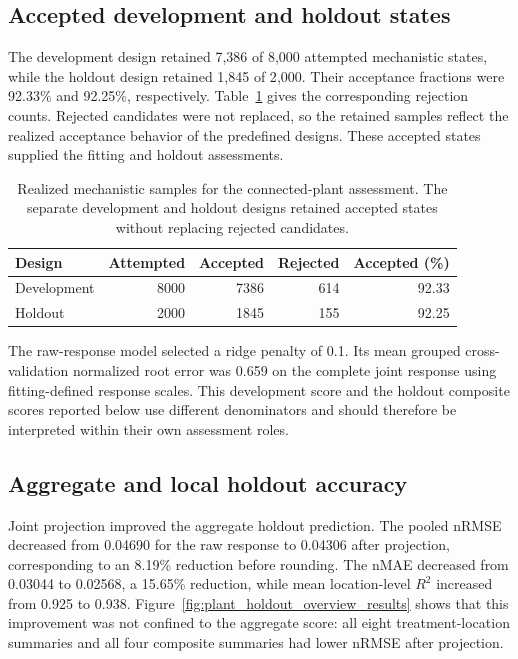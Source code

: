 \subsection{Accepted development and holdout states}

The development design retained 7{,}386 of 8{,}000 attempted mechanistic states, while the holdout design retained 1{,}845 of 2{,}000. Their acceptance fractions were 92.33\% and 92.25\%, respectively. Table~\ref{tab:plant_sample_results} gives the corresponding rejection counts. Rejected candidates were not replaced, so the retained samples reflect the realized acceptance behavior of the predefined designs. These accepted states supplied the fitting and holdout assessments.

\begin{table}[htbp]
\centering\small
\caption{Realized mechanistic samples for the connected-plant assessment. The separate development and holdout designs retained accepted states without replacing rejected candidates.}
\label{tab:plant_sample_results}
\begin{tabular}{lrrrr}
\toprule
Design & Attempted & Accepted & Rejected & Accepted (\%)\\
\midrule
Development & 8000 & 7386 & 614 & 92.33\\
Holdout & 2000 & 1845 & 155 & 92.25\\
\bottomrule
\end{tabular}
\end{table}

The raw-response model selected a ridge penalty of 0.1. Its mean grouped cross-validation normalized root error was 0.659 on the complete joint response using fitting-defined response scales. This development score and the holdout composite scores reported below use different denominators and should therefore be interpreted within their own assessment roles.

\subsection{Aggregate and local holdout accuracy}

Joint projection improved the aggregate holdout prediction. The pooled nRMSE decreased from 0.04690 for the raw response to 0.04306 after projection, corresponding to an 8.19\% reduction before rounding. The nMAE decreased from 0.03044 to 0.02568, a 15.65\% reduction, while mean location-level $R^2$ increased from 0.925 to 0.938. Figure~\ref{fig:plant_holdout_overview_results} shows that this improvement was not confined to the aggregate score: all eight treatment-location summaries and all four composite summaries had lower nRMSE after projection.

